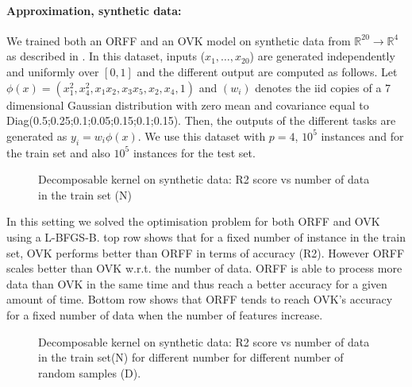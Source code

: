 \documentclass{article}
\begin{document}
\paragraph{Approximation, synthetic data:} We trained both an ORFF and an OVK model on synthetic data from $\mathbb{R}^{20}\to\mathbb{R}^4$ as described in \cite{audiffren2013online}.  
In  this  dataset,  inputs  ($x_1, \hdots, x_{20}$)  are  generated  independently  and  uniformly over $[0, 1]$ and  the  different  output  are  computed  as  follows. 
Let $\phi(x)=(x_1^2, x_4^2, x_1x_2, x_3x_5, x_2, x_4, 1)$ and $(w_i)$ denotes the iid copies of a 7 dimensional Gaussian distribution with zero mean and covariance equal to Diag(0.5;0.25;0.1;0.05;0.15;0.1;0.15).  
Then, the outputs of the different tasks are generated as $y_i=w_i\phi(x)$. 
We use this dataset with $p=4$, $10^5$ instances and for the train set and also $10^5$ instances for the test set.
\begin{figure}
\centering
\resizebox{.7\textwidth}{!}{%

}
\caption{Decomposable kernel on synthetic data: R2 score vs number of data in the train set (N)}
\label{fig:ORFFvsOVK_dec}
\end{figure}
In this setting we solved the optimisation problem for both ORFF and OVK using a L-BFGS-B.  top row shows that for a fixed number of instance in the train set, OVK performs better than ORFF in terms of accuracy (R2). However ORFF scales better than OVK w.r.t. the number of data. ORFF is able to process more data than OVK in the same time and thus reach a better accuracy for a given amount of time. Bottom row shows that ORFF tends to reach OVK's accuracy for a fixed number of data when the number of features increase.

\begin{figure}
\centering
\resizebox{.55\textwidth}{!}{%

}
\caption{Decomposable kernel on synthetic data: R2 score vs number of data in the train set(N) for different number for different number of random samples (D).}
\label{fig:ORFFvsOVK}
\end{figure}
\end{document}
